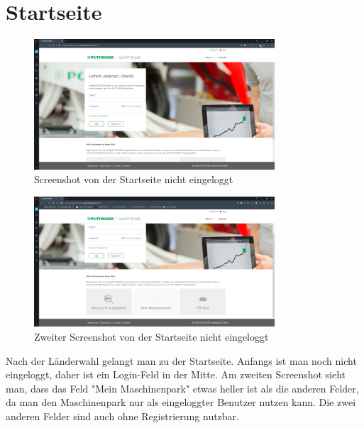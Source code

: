 \section{Startseite}
\begin{figure}[H]
	\centerline{
		\includegraphics[width=0.8\textwidth]{./grafiken/erm_home_not_logged_in.png}
	}
	\vskip0pt
	\caption{Screenshot von der Startseite nicht eingeloggt} \label{fig:homeNotLoggedIn}
\end{figure}
\begin{figure}[H]
	\centerline{
		\includegraphics[width=0.8\textwidth]{./grafiken/erm_home_not_logged_in_2.png}
	}
	\vskip0pt
	\caption{Zweiter Screenshot von der Startseite nicht eingeloggt} \label{fig:homeNotLoggedIn2}
\end{figure}
Nach der Länderwahl gelangt man zu der Startseite. Anfangs ist man noch nicht eingeloggt, daher ist ein Login-Feld in der Mitte. Am zweiten Screenshot sieht man, dass das Feld "Mein Maschinenpark" etwas heller ist als die anderen Felder, da man den Maschinenpark nur als eingeloggter Benutzer nutzen kann. Die zwei anderen Felder sind auch ohne Registrierung nutzbar.
 
